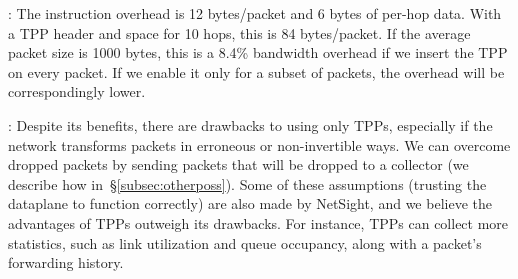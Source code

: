 : The instruction overhead is 12 bytes/packet and
6 bytes of per-hop data.  With a
TPP header and space for 10 hops, this is 84 bytes/packet.  If
the average packet size is 1000 bytes, this is a 8.4\% bandwidth
overhead if we insert the TPP on every packet.  If we enable it only
for a subset of packets, the overhead will be correspondingly lower.

: Despite its benefits, there are drawbacks to using only TPPs,
especially if the network transforms packets in erroneous or non-invertible ways.
We can overcome dropped packets by sending packets that will be
dropped to a collector (we describe how in~\S\ref{subsec:otherposs}).
Some of these assumptions (trusting the dataplane to function
correctly) are also made by NetSight, and we
believe the advantages of TPPs outweigh its drawbacks.  For instance,
TPPs can collect more statistics, such as link utilization and queue
occupancy, along with a packet's forwarding history.


